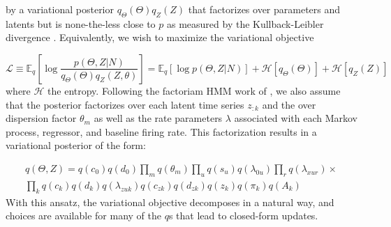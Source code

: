\documentclass{article} %
\begin{document}
by a variational posterior $q_\Theta(\Theta)q_Z(Z)$ that factorizes over parameters and latents but is none-the-less close to $p$ as measured by the Kullback-Leibler divergence \cite{Wainwright2008-ii}. Equivalently, we wish to maximize the variational objective

\begin{equation}
    \mathcal{L} \equiv \mathbb{E}_q \left[\log \frac{p(\Theta,Z|N)}{q_\Theta(\Theta)q_Z(Z,\theta)} \right] = \mathbb{E}_q \left[\log p(\Theta,Z|N) \right] + \mathcal{H}[q_\Theta(\Theta)] + \mathcal{H}[q_Z(Z)]
\end{equation}
where $\mathcal{H}$ the entropy. Following the factoriam HMM work of \cite{ghahramani1997factorial}, we also assume that the posterior factorizes over each latent time series $z_{:k}$ and the over dispersion factor $\theta_m$ as well as the rate parameters $\lambda$ associated with each Markov process, regressor, and baseline firing rate.  This factorization results in a variational posterior of the form:

\begin{multline}
    q(\Theta,Z) = q(c_0)q(d_0)\prod_m q(\theta_m) \prod_u q(s_u) q(\lambda_{0u}) \prod_r q(\lambda_{xur}) \times \\ 
    \prod_k q(c_k) q(d_k) 
    q(\lambda_{zuk}) q(c_{zk}) q(d_{zk}) q(z_k) q(\pi_k) q(A_k)
\end{multline}
With this ansatz, the variational objective decomposes in a natural way, and choices are available for many of the $q$s that lead to closed-form updates.
\end{document}
